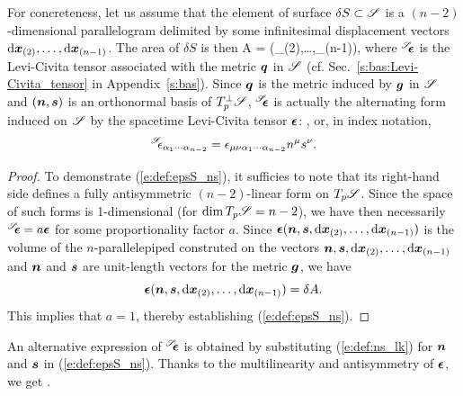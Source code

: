 For concreteness, let us assume that the element of surface $\delta S \subset\mathscr{S}$ is a $(n-2)$-dimensional
parallelogram delimited by some infinitesimal displacement vectors
$\mathrm{d}\bm{x}_{(2)},\ldots,\mathrm{d}\bm{x}_{(n-1)}$. The area of $\delta S$ is then
\be \label{e:def:A_wepsS_dx}
    \delta A = \wepsS(\D{}_{(2)},\ldots,\D{}_{(n-1)}),
\ee
where ${}^{\mathscr{S}}\!\!\bm{\epsilon}$ is the Levi-Civita tensor
associated with the metric $\bm{q}$
in $\mathscr{S}$ (cf. Sec.~\ref{s:bas:Levi-Civita_tensor} in Appendix~\ref{s:bas}).
Since $\bm{q}$ is the metric induced by $\bm{g}$ in $\mathscr{S}$ and $(\bm{n},\bm{s})$
is an orthonormal basis of $T_p^\perp \mathscr{S}$, ${}^{\mathscr{S}}\!\!\bm{\epsilon}$ is actually the
alternating form induced on $\mathscr{S}$ by the spacetime Levi-Civita tensor
$\bm{\epsilon}$:
\be \label{e:def:epsS_ns}
    ,
\ee
or, in index notation,
\[
    {}^{\mathscr{S}}\!\!\epsilon_{\alpha_1\cdots\alpha_{n-2}} = \epsilon_{\mu\nu\alpha_1\cdots\alpha_{n-2}} n^\mu s^\nu .
\]
\begin{proof}
To demonstrate (\ref{e:def:epsS_ns}), it sufficies to note that its right-hand side
defines a fully antisymmetric $(n-2)$-linear form on $T_p\mathscr{S}$. Since the space
of such forms is 1-dimensional (for $\dim T_p\mathscr{S} = n-2$), we have then
necessarily ${}^{\mathscr{S}}\!\!\bm{\epsilon} = a \bm{\epsilon}$ for some proportionality factor $a$. Since
$\bm{\epsilon}(\bm{n},\bm{s},\mathrm{d}\bm{x}_{(2)},\ldots,\mathrm{d}\bm{x}_{(n-1)})$ is the volume
of the $n$-parallelepiped construted on the vectors $\bm{n},\bm{s},\mathrm{d}\bm{x}_{(2)},\ldots,\mathrm{d}\bm{x}_{(n-1)}$ and $\bm{n}$ and $\bm{s}$ are unit-length vectors for the metric $\bm{g}$,
we have
\[
    \bm{\epsilon}(\bm{n},\bm{s},\mathrm{d}\bm{x}_{(2)},\ldots,\mathrm{d}\bm{x}_{(n-1)}) = \delta A.
\]
This implies that $a=1$, thereby establishing (\ref{e:def:epsS_ns}).
\end{proof}
An alternative expression of ${}^{\mathscr{S}}\!\!\bm{\epsilon}$ is obtained by substituting (\ref{e:def:ns_lk})
for $\bm{n}$ and $\bm{s}$ in (\ref{e:def:epsS_ns}). Thanks to the multilinearity
and antisymmetry of $\bm{\epsilon}$, we get
\be
     .
\ee

